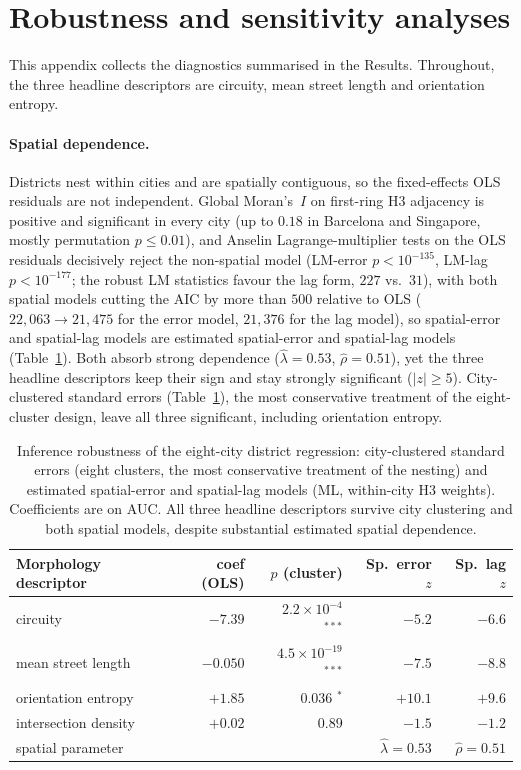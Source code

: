 \documentclass[sn-mathphys-num,pdflatex]{sn-jnl}
\begin{document}
\appendix
\section{Robustness and sensitivity analyses}\label{app:robust}
This appendix collects the diagnostics summarised in the Results. Throughout, the
three headline descriptors are circuity, mean street length and orientation entropy.

\paragraph{Spatial dependence.} Districts nest within cities and are spatially
contiguous, so the fixed-effects OLS residuals are not independent. Global Moran's~$I$
on first-ring H3 adjacency is positive and significant in every city (up to $0.18$ in
Barcelona and Singapore, mostly permutation $p\le0.01$), and Anselin
Lagrange-multiplier tests on the OLS residuals
decisively reject the non-spatial model (LM-error $p<10^{-135}$, LM-lag
$p<10^{-177}$; the robust LM statistics favour the lag form, $227$ vs.\ $31$), with
both spatial models cutting the AIC by more than $500$ relative to OLS
($22{,}063\to21{,}475$ for the error model, $21{,}376$ for the lag model), so
spatial-error and spatial-lag models are estimated spatial-error and spatial-lag models (Table~\ref{tab:spatial}).
Both absorb strong dependence ($\hat\lambda=0.53$, $\hat\rho=0.51$), yet the three
headline descriptors keep their sign and stay strongly significant ($|z|\ge5$).
City-clustered standard errors (Table~\ref{tab:spatial}), the most conservative
treatment of the eight-cluster design, leave all three significant, including
orientation entropy.

\begin{table}[t]\centering
\caption{Inference robustness of the eight-city district regression: city-clustered
standard errors (eight clusters, the most conservative treatment of the nesting) and
estimated spatial-error and spatial-lag models (ML, within-city H3 weights).
Coefficients are on AUC. All three headline descriptors survive city clustering and
both spatial models, despite substantial estimated spatial dependence.}
\label{tab:spatial}
\begin{tabular}{lrrrr}
\toprule
Morphology descriptor & coef (OLS) & $p$ (cluster) & Sp.\ error $z$ & Sp.\ lag $z$\\
\midrule
circuity & $-7.39$ & $2.2\times10^{-4}$ $^{***}$ & $-5.2$ & $-6.6$\\
mean street length & $-0.050$ & $4.5\times10^{-19}$ $^{***}$ & $-7.5$ & $-8.8$\\
orientation entropy & $+1.85$ & $0.036$ $^{*}$ & $+10.1$ & $+9.6$\\
intersection density & $+0.02$ & $0.89$ & $-1.5$ & $-1.2$\\
\midrule
spatial parameter & & & $\hat\lambda=0.53$ & $\hat\rho=0.51$\\
\bottomrule
\end{tabular}
\end{table}
\end{document}
